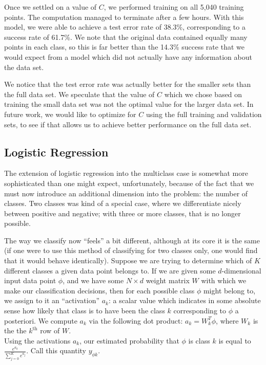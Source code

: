 \documentclass{sigchi}
\begin{document}
Once we settled on a value of $C$, we performed training on all 5,040 training points. The computation managed to terminate after a few hours. With this model, we were able to achieve a test error rate of 38.3\%, corresponding to a success rate of 61.7\%. We note that the original data contained equally many points in each class, so this is far better than the 14.3\% success rate that we would expect from a model which did not actually have any information about the data set.

We notice that the test error rate was actually better for the smaller sets than the full data set. We speculate that the value of $C$ which we chose based on training the small data set was not the optimal value for the larger data set. In future work, we would like to optimize for $C$ using the full training and validation sets, to see if that allows us to achieve better performance on the full data set.

\subsection{Logistic Regression}

The extension of logistic regression into the multiclass case is somewhat more sophisticated than one might expect, unfortunately, because of the fact that we must now introduce an additional dimension into the problem: the number of classes. Two classes was kind of a special case, where we differentiate nicely between positive and negative; with three or more classes, that is no longer possible. 

The way we classify now ``feels'' a bit different, although at its core it is the same (if one were to use this method of classifying for two classes only, one would find that it would behave identically). Suppose we are trying to determine which of $K$ different classes a given data point belongs to. If we are given some $d$-dimensional input data point $\phi$, and we have some $N \times d$ weight matrix $W$ with which we make our classification decisions, then for each possible class $\phi$ might belong to, we assign to it an ``activation'' $a_k$: a scalar value which indicates in some absolute sense how likely that class is to have been the class $k$ corresponding to $\phi$ a posteriori. We compute $a_k$ via the following dot product: $a_k = W_k^T\phi$, where $W_k$ is the the $k^{\textrm{th}}$ row of $W$. \\

Using the activations $a_k$, our estimated probability that $\phi$ is class $k$ is equal to $\frac{e^{a_k}}{\sum_{j=0}^K e^{a_j}}$. Call this quantity $y_{\phi k}$. \\
\end{document}
